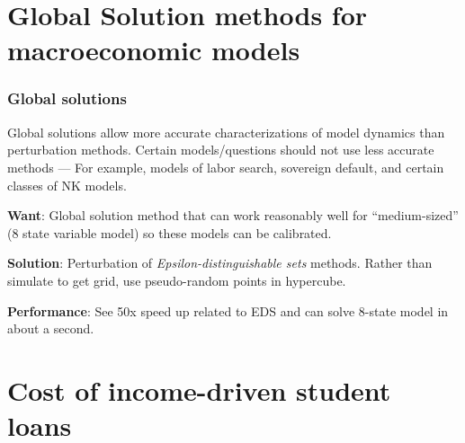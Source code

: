 \documentclass[10pt]{beamer}
\begin{document}
\section{Global Solution methods for macroeconomic models}

  \begin{frame} \frametitle{Global solutions}

    Global solutions allow more accurate characterizations of model dynamics than perturbation
    methods. Certain models/questions should not use less accurate methods --- For example, models
    of labor search, sovereign default, and certain classes of NK models.

    \vspace{0.25cm}

    \textbf{Want}: Global solution method that can work reasonably well for ``medium-sized'' (8
    state variable model) so these models can be calibrated.

    \vspace{0.25cm}

    \textbf{Solution}: Perturbation of \textit{Epsilon-distinguishable sets} methods. Rather than
    simulate to get grid, use pseudo-random points in hypercube.

    \vspace{0.25cm}

    \textbf{Performance}: See 50x speed up related to EDS and can solve 8-state model in
    about a second.

  \end{frame}


\section{Cost of income-driven student loans}
\end{document}
